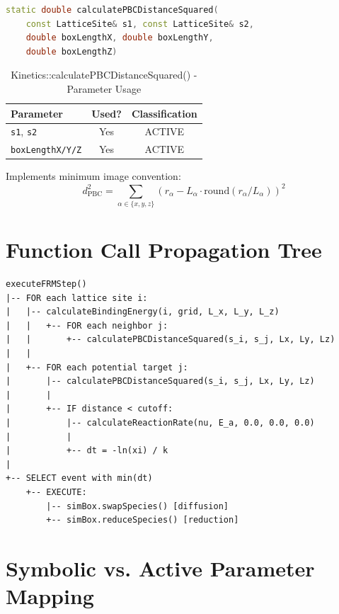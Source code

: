 \documentclass[11pt,a4paper]{article}
\begin{document}
\begin{lstlisting}[language=C++, breaklines=true]
static double calculatePBCDistanceSquared(
    const LatticeSite& s1, const LatticeSite& s2,
    double boxLengthX, double boxLengthY, 
    double boxLengthZ)
\end{lstlisting}

\begin{table}[H]
\centering
\caption{Kinetics::calculatePBCDistanceSquared() - Parameter Usage}
\begin{tabular}{|l|c|c|}
\hline
\textbf{Parameter} & \textbf{Used?} & \textbf{Classification} \\
\hline
\texttt{s1}, \texttt{s2} & Yes & ACTIVE \\
\texttt{boxLengthX/Y/Z} & Yes & ACTIVE \\
\hline
\end{tabular}
\end{table}

Implements minimum image convention:
\begin{equation}
d_{\text{PBC}}^2 = \sum_{\alpha \in \{x,y,z\}} \left(r_\alpha - L_\alpha \cdot \text{round}(r_\alpha / L_\alpha)\right)^2
\end{equation}

\newpage

\section{Function Call Propagation Tree}

\begin{verbatim}
executeFRMStep()
|-- FOR each lattice site i:
|   |-- calculateBindingEnergy(i, grid, L_x, L_y, L_z)
|   |   +-- FOR each neighbor j:
|   |       +-- calculatePBCDistanceSquared(s_i, s_j, Lx, Ly, Lz)
|   |
|   +-- FOR each potential target j:
|       |-- calculatePBCDistanceSquared(s_i, s_j, Lx, Ly, Lz)
|       |
|       +-- IF distance < cutoff:
|           |-- calculateReactionRate(nu, E_a, 0.0, 0.0, 0.0)
|           |
|           +-- dt = -ln(xi) / k
|
+-- SELECT event with min(dt)
    +-- EXECUTE:
        |-- simBox.swapSpecies() [diffusion]
        +-- simBox.reduceSpecies() [reduction]
\end{verbatim}

\newpage

\section{Symbolic vs. Active Parameter Mapping}
\end{document}
